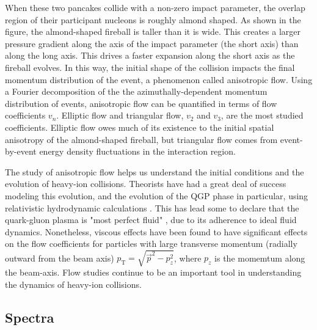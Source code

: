 When these two pancakes collide with a non-zero impact parameter, the overlap region of their participant nucleons is roughly almond shaped.
As shown in the figure, the almond-shaped fireball is taller than it is wide.
This creates a larger pressure gradient along the axis of the impact parameter (the short axis) than along the long axis.
This drives a faster expansion along the short axis as the fireball evolves.
In this way, the initial shape of the collision impacts the final momentum distribution of the event, a phenomenon called anisotropic flow.
Using a Fourier decomposition of the the azimuthally-dependent momentum distribution of events, anisotropic flow can be quantified in terms of flow coefficients $v_n$.
Elliptic flow and triangular flow, $v_2$ and $v_3$,  are the most studied coefficients.
Elliptic flow owes much of its existence to the initial spatial anisotropy of the almond-shaped fireball, but triangular flow comes from event-by-event energy density fluctuations in the interaction region.

The study of anisotropic flow helps us understand the initial conditions and the evolution of heavy-ion collisions.
Theorists have had a great deal of success modeling  this evolution, and the evolution of the QGP phase in particular, using relativistic hydrodynamic calculations \cite{Heinz:2013th}.
This has lead some to declare that the quark-gluon plasma is "most perfect fluid" \cite{Heinz:2005zg}, due to its adherence to ideal fluid dynamics.
Nonetheless, viscous effects have been found to have significant effects on the flow coefficients for particles with large transverse momentum (radially outward from the beam axis) $p_\mathrm{T} = \sqrt{\vec{p}^2 - p_z^2}$, where $p_z$ is the momemtum along the beam-axis.
Flow studies continue to be an important tool in understanding the dynamics of heavy-ion collisions.

\subsection{Spectra}

